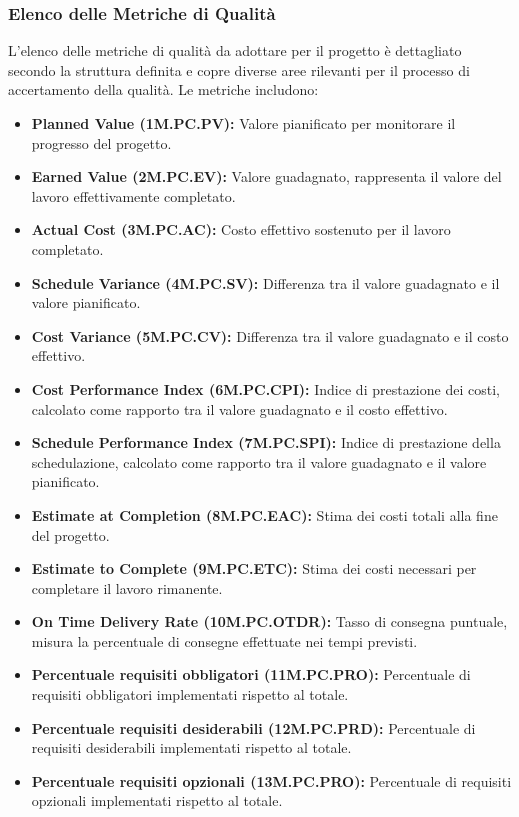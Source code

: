 \subsubsection{Elenco delle Metriche di Qualità} 
L'elenco delle metriche di qualità da adottare per il progetto è dettagliato secondo la struttura definita e copre diverse aree rilevanti per il processo di accertamento della qualità. Le metriche includono:
\begin{itemize}
    \item \textbf{Planned Value (1M.PC.PV):} Valore pianificato per monitorare il progresso del progetto.
    \item \textbf{Earned Value (2M.PC.EV):} Valore guadagnato, rappresenta il valore del lavoro effettivamente completato.
    \item \textbf{Actual Cost (3M.PC.AC):} Costo effettivo sostenuto per il lavoro completato.
    \item \textbf{Schedule Variance (4M.PC.SV):} Differenza tra il valore guadagnato e il valore pianificato.
    \item \textbf{Cost Variance (5M.PC.CV):} Differenza tra il valore guadagnato e il costo effettivo.
    \item \textbf{Cost Performance Index (6M.PC.CPI):} Indice di prestazione dei costi, calcolato come rapporto tra il valore guadagnato e il costo effettivo.
    \item \textbf{Schedule Performance Index (7M.PC.SPI):} Indice di prestazione della schedulazione, calcolato come rapporto tra il valore guadagnato e il valore pianificato.
    \item \textbf{Estimate at Completion (8M.PC.EAC):} Stima dei costi totali alla fine del progetto.
    \item \textbf{Estimate to Complete (9M.PC.ETC):} Stima dei costi necessari per completare il lavoro rimanente.
    \item \textbf{On Time Delivery Rate (10M.PC.OTDR):} Tasso di consegna puntuale, misura la percentuale di consegne effettuate nei tempi previsti.
    \item \textbf{Percentuale requisiti obbligatori (11M.PC.PRO):} Percentuale di requisiti obbligatori implementati rispetto al totale.
    \item \textbf{Percentuale requisiti desiderabili (12M.PC.PRD):} Percentuale di requisiti desiderabili implementati rispetto al totale.
    \item \textbf{Percentuale requisiti opzionali (13M.PC.PRO):} Percentuale di requisiti opzionali implementati rispetto al totale.

\end{itemize}
